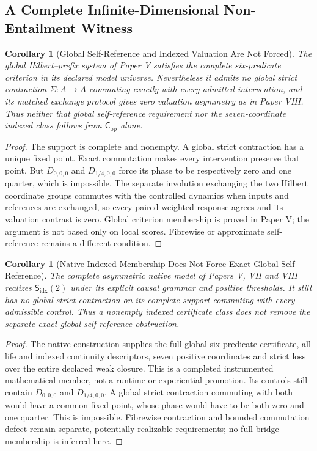 \documentclass[11pt,a4paper]{article}
\newtheorem{corollary}[theorem]{Corollary}
\theoremstyle{definition}
\newcommand{\Cop}{\mathsf{C}_{\mathrm{op}}}
\newcommand{\Subfp}{\mathsf{S}_{\mathrm{idx}}}
\begin{document}
\subsection{A Complete Infinite-Dimensional Non-Entailment Witness}
\begin{corollary}[Global Self-Reference and Indexed Valuation Are Not Forced]\label{cor:infinite-cop-nonentailed}
The global Hilbert--prefix system of Paper V satisfies the complete six-predicate criterion in its declared model universe. Nevertheless it admits no global strict contraction $\Sigma:A\to A$ commuting exactly with every admitted intervention, and its matched exchange protocol gives zero valuation asymmetry as in Paper VIII. Thus neither that global self-reference requirement nor the seven-coordinate indexed class follows from $\Cop$ alone.
\end{corollary}
\begin{proof}
The support is complete and nonempty. A global strict contraction has a unique fixed point. Exact commutation makes every intervention preserve that point. But $D_{0,0,0}$ and $D_{1/4,0,0}$ force its phase to be respectively zero and one quarter, which is impossible. The separate involution exchanging the two Hilbert coordinate groups commutes with the controlled dynamics when inputs and references are exchanged, so every paired weighted response agrees and its valuation contrast is zero. Global criterion membership is proved in Paper V; the argument is not based only on local scores. Fibrewise or approximate self-reference remains a different condition.
\end{proof}

\begin{corollary}[Native Indexed Membership Does Not Force Exact Global Self-Reference]
\label{cor:native-indexed-selfreference-boundary}
The complete asymmetric native model of Papers V, VII and VIII realizes
$\Subfp(2)$ under its explicit causal grammar and positive thresholds.
It still has no global strict contraction on its complete support commuting
with every admissible control. Thus a nonempty indexed certificate class
does not remove the separate exact-global-self-reference obstruction.
\end{corollary}
\begin{proof}
The native construction supplies the full global six-predicate certificate,
all life and indexed continuity descriptors, seven positive coordinates and
strict loss over the entire declared weak closure. This is a completed
instrumented mathematical member, not a runtime or experiential promotion.
Its controls still contain $D_{0,0,0}$ and $D_{1/4,0,0}$. A global strict
contraction commuting with both would have a common fixed point, whose phase
would have to be both zero and one quarter. This is impossible. Fibrewise
contraction and bounded commutation defect remain separate, potentially
realizable requirements; no full bridge membership is inferred here.
\end{proof}
\end{document}
